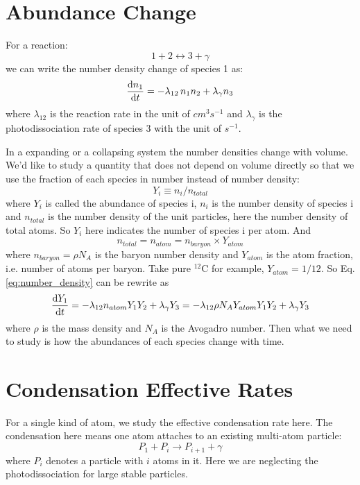 \documentclass{article}
\begin{document}
\section{Abundance Change}

For a reaction:
\[
1 + 2 \longleftrightarrow 3 + \gamma
\]
we can write the number density change of species 1 as:
\begin{equation}
\frac{{\rm d}n_1}{{\rm d}t} = 
  -\lambda_{12} \, n_1 n_2 + \lambda_\gamma n_3
\label{eq:number_density}
\end{equation}
where $\lambda_{12}$ is the reaction rate in the unit of $cm^3s^{-1}$ and 
$\lambda_\gamma$ is the photodissociation rate of species 3 with the unit of
$s^{-1}$.

In a expanding or a collapsing system the number densities change with volume. 
We'd like to study a quantity that does not depend on volume directly so that
we use the fraction of each species in number instead of number density:
\[
Y_i \equiv n_i / n_{total}
\]
where $Y_i$ is called the abundance of species i, $n_i$ is the number density
of species i and $n_{total}$ is the number density of the unit particles, here
the number density of total atoms. So $Y_i$ here indicates the number
of species i per atom. And
\[
n_{total} = n_{atom} = n_{baryon} \times Y_{atom} 
\]
where $n_{baryon} = \rho N_A$ is the baryon number density and $Y_{atom}$ is
the atom fraction, i.e. number of atoms per baryon. Take pure $^{12}$C for 
example, $Y_{atom} = 1 / 12$. So Eq.\ref{eq:number_density} can be rewrite as
\begin{equation}
\frac{{\rm d}Y_1}{{\rm d}t} = 
  -\lambda_{12} n_{atom} Y_1 Y_2 + \lambda_\gamma Y_3 =
  -\lambda_{12} \rho N_A Y_{atom} Y_1 Y_2 + \lambda_\gamma Y_3
\label{eq:abundance}
\end{equation}
where $\rho$ is the mass density and $N_A$ is the Avogadro number. Then what
we need to study is how the abundances of each species change with time.

\section{Condensation Effective Rates}

For a single kind of atom, we study the effective condensation rate here.
The condensation here means one atom attaches to an existing multi-atom
particle:
\begin{equation}
P_1 + P_i \to P_{i+1} + \gamma
\label{eq:reaction}
\end{equation} 
where $P_i$ denotes a particle with $i$ atoms in it. Here we are neglecting
the photodissociation for large stable particles.
\end{document}

